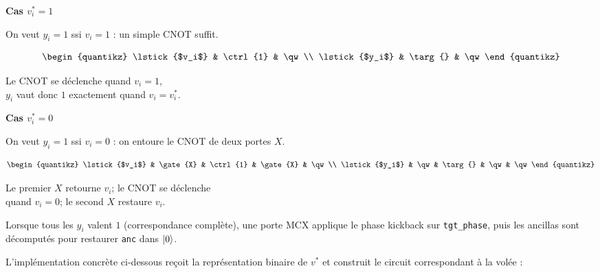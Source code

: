 \documentclass{ceri/sty/rapport}
\begin{document}
\medskip
\noindent\begin{minipage}[t]{0.46\linewidth}
\centering
\textbf{Cas $v^*_i = 1$}

\smallskip
On veut $y_i = 1$ ssi $v_i = 1$ : un simple CNOT suffit.

\medskip
\[
\begin{quantikz}
  \lstick{$v_i$} & \ctrl{1} & \qw \\
  \lstick{$y_i$} & \targ{}  & \qw
\end{quantikz}
\]

\smallskip
{\small Le CNOT se déclenche quand $v_i = 1$,\\
$y_i$ vaut donc $1$ exactement quand $v_i = v^*_i$.}
\end{minipage}%
\hfill%
\begin{minipage}[t]{0.46\linewidth}
\centering
\textbf{Cas $v^*_i = 0$}

\smallskip
On veut $y_i = 1$ ssi $v_i = 0$ : on entoure le CNOT de deux portes $X$.

\medskip
\[
\begin{quantikz}
  \lstick{$v_i$} & \gate{X} & \ctrl{1} & \gate{X} & \qw \\
  \lstick{$y_i$} & \qw      & \targ{}  & \qw      & \qw
\end{quantikz}
\]

\smallskip
{\small Le premier $X$ retourne $v_i$; le CNOT se déclenche\\
quand $v_i = 0$; le second $X$ restaure $v_i$.}
\end{minipage}

\medskip
Lorsque tous les $y_i$ valent $1$ (correspondance complète), une porte MCX
applique le phase kickback sur \texttt{tgt\_phase}, puis les ancillas sont
décomputés pour restaurer \texttt{anc} dans $\ket{0}$.

\smallskip
L'implémentation concrète ci-dessous reçoit la représentation binaire de
$v^*$ et construit le circuit correspondant à la volée :
\end{document}
